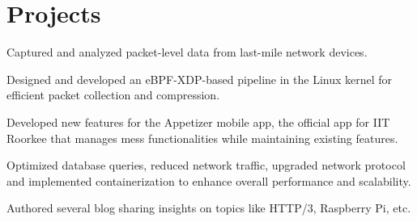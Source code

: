 \documentclass[letterpaper]{deedy-resume} %
\begin{document}
\begin{minipage}[t]{0.66\textwidth}
\sectionspace %



\section{Projects} 

\begin{tightitemize}
\item Captured and analyzed packet-level data from last-mile network devices.
\item Designed and developed an eBPF-XDP-based pipeline in the Linux kernel for efficient packet collection and compression.
\end{tightitemize}
\sectionspace %

\begin{tightitemize}
\item Developed new features for the Appetizer mobile app, the official app for IIT Roorkee that manages mess functionalities while maintaining existing features.
\item Optimized database queries, reduced network traffic, upgraded network protocol and implemented containerization to enhance overall performance and scalability.
\end{tightitemize}
\sectionspace %

Authored several blog sharing insights on topics like HTTP/3, Raspberry Pi, etc.


\end{minipage}
\end{document}
